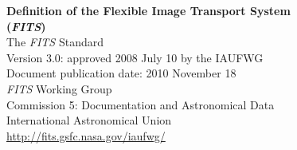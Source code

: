 \documentclass[onecolumn]{aa}
\begin{document}
 


\newcommand{\keyw}[1]{\hbox{{\tt #1}}}
\newcommand{\keyi}[2]{\hbox{{\tt #1\hspace{1pt}}{$#2$}\/}}
\newcommand{\CRPIX}[1]{\keyi{CRPIX}{#1}}
\newcommand{\CDELT}[1]{\keyi{CDELT}{#1}}
\newcommand{\CRVAL}[1]{\keyi{CRVAL}{#1}}
\newcommand{\CTYPE}[1]{\keyi{CTYPE}{#1}}
\newcommand{\CUNIT}[1]{\keyi{CUNIT}{#1}}
\newcommand{\NAXIS}[1]{\keyi{NAXIS}{#1}}
\newcommand{\CROTA}[1]{\keyi{CROTA}{#1}}
\newcommand{\keyii}[3]{\hbox{{\tt #1\hspace{1pt}{$#2$}\_{$#3$}}\/}}
\newcommand{\PC}[2]{\keyii{PC}{#1}{#2}}
\newcommand{\CD}[2]{\keyii{CD}{#1}{#2}}
\newcommand{\PV}[2]{\keyii{PV}{#1}{#2}}
\newcommand{\PS}[2]{\keyii{PS}{#1}{#2}}
\newcommand{\keyv}[1]{\hbox{{\tt #1}}}
\newcommand{\PCij}{\PC{i}{j}}
\newcommand{\CDij}{\CD{i}{j}}
\newcommand{\Ci}{{\it a\/}}
\newcommand{\NN}[1]{\noalign{\noindent{#1}}\noalign{\vspace{4pt}}}

\newcommand{\kwd}[1]{\texttt{#1}}
\newcommand{\kwdalt}[1]{\kwd{#1}\textit{a}}
\newcommand{\indxkw}[2]{\texttt{#1}\textit{#2}}
\newcommand{\indxkwdalt}[2]{\indxkw{#1}{#2}\textit{a}}
\newcommand{\dindxkw}[3]{\textit{#1}\/\indxkw{#2}{#3}}
\newcommand{\dindxkwalt}[3]{\dindxkw{#1}{#2}{#3}\textit{a}}


\ifiaufwgstyle 

\begin{titlepage}
\begin{center}

\vspace*{4.0cm}
{\huge \bf Definition of the Flexible Image Transport System \\
\vspace{0.2cm}
({\em FITS\/})} \\


{\large
\vspace{5.0cm}
The {\em FITS\/} Standard \\

\vspace{0.3cm}
Version 3.0: approved 2008 July 10 by the IAUFWG  \\

\vspace{0.3cm}
Document publication date: 2010 November 18 \\


\vspace{6.0cm}
{\em FITS\/} Working Group \\
Commission 5: Documentation and Astronomical Data \\
International Astronomical Union \\
\url{http://fits.gsfc.nasa.gov/iaufwg/} \\
}

\end{center}
\end{titlepage}
\setcounter{page}{0}
\pagestyle{empty}
\end{document}
